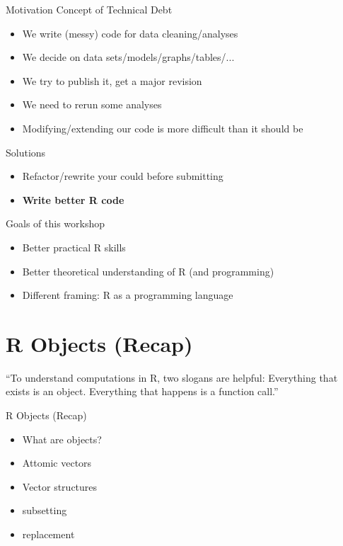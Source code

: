 \documentclass{beamer}\usepackage[]{graphicx}\usepackage[]{color}
\begin{document}
\begin{frame}{Motivation}
Concept of Technical Debt
\begin{itemize}
  \item We write (messy) code for data cleaning/analyses
  \item We decide on data sets/models/graphs/tables/...
  \item We try to publish it, get a major revision
  \item We need to rerun some analyses
  \item Modifying/extending our code is more difficult than it should be
\end{itemize}
Solutions
\begin{itemize}
  \item Refactor/rewrite your could before submitting
  \item \textbf{Write better R code}
\end{itemize}
\end{frame}

\begin{frame}{Goals of this workshop}
\begin{itemize}
  \item Better practical R skills
  \item Better theoretical understanding of R (and programming)
  \item Different framing: R as a programming language
\end{itemize}
\end{frame}


\section{R Objects (Recap)}



\begin{frame}[fragile]
\begin{exampleblock}{}
  {\large ``To understand computations in R, two slogans are helpful: Everything that exists is an object. Everything that happens is a function call.''}
  \vskip5mm
  \hspace*{}
\end{exampleblock}
\end{frame}


\begin{frame}{R Objects (Recap)}

	\begin{itemize}
			\item What are objects?
			\item Attomic vectors
			\item Vector structures
			\item subsetting
			\item replacement
	\end{itemize}
\end{frame}
\end{document}
